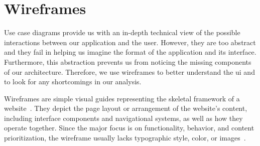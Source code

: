 \section{Wireframes}
Use case diagrams provide us with an in-depth technical view of the possible interactions between our application and the user.
However, they are too abstract and they fail in helping us imagine the format of the application and its interface.
Furthermore, this abstraction prevents us from noticing the missing components of our architecture.
Therefore, we use wireframes to better understand the \acrfull{ui} and to look for any shortcomings in our analysis.

Wireframes are simple visual guides representing the skeletal framework of a website~\autocite{gemayel_how_nodate}.
They depict the page layout or arrangement of the website's content, including interface components and navigational systems, as well as how they operate together.
Since the major focus is on functionality, behavior, and content prioritization, the wireframe usually lacks typographic style, color, or images~\autocite{garrett_elements_2011}.

